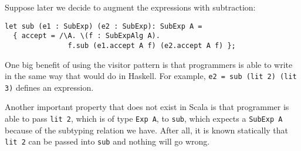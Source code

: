 Suppose later we decide to augment the expressions with subtraction:
\begin{lstlisting}
let sub (e1 : SubExp) (e2 : SubExp): SubExp A =
  { accept = /\A. \(f : SubExpAlg A).
               f.sub (e1.accept A f) (e2.accept A f) };
\end{lstlisting}

One big benefit of using the visitor pattern is that programmers is able to
write in the same way that would do in Haskell.
For example, \lstinline{e2 = sub (lit 2) (lit 3)} defines an expression.

Another important property that does not exist in Scala is that programmer is
able to pass \lstinline{lit 2}, which is of type \lstinline{Exp A}, to
\lstinline{sub}, which expects a \lstinline{SubExp A} because of the subtyping
relation we have. After all, it is known statically that \lstinline{lit 2} can
be passed into \lstinline{sub} and nothing will go
wrong.





